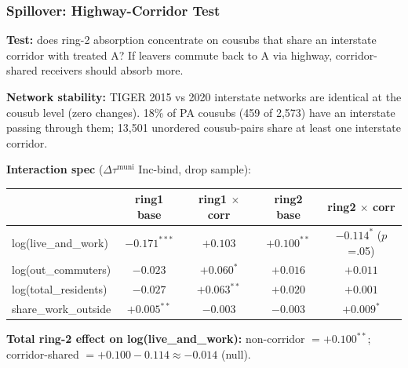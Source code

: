 \documentclass[xcolor = x11names, compress, aspectratio = 169]{beamer}
\begin{document}
    \begin{frame}
    \frametitle{Spillover: Highway-Corridor Test}
        \footnotesize
        \textbf{Test:} does ring-2 absorption concentrate on cousubs that
        share an interstate corridor with treated A? If leavers commute
        back to A via highway, corridor-shared receivers should absorb more.
        \medskip

        \textbf{Network stability:} TIGER 2015 vs 2020 interstate networks
        are identical at the cousub level (zero changes). 18\% of PA cousubs
        (459 of 2{,}573) have an interstate passing through them; 13{,}501
        unordered cousub-pairs share at least one interstate corridor.
        \medskip

        \textbf{Interaction spec} ($\Delta\tau^{\text{muni}}$ Inc-bind, drop sample):
        \scriptsize
        \renewcommand{\arraystretch}{1.15}
        \setlength{\tabcolsep}{6pt}
        \begin{tabular}{lcccc}
            \toprule
            & ring1 base & ring1 $\times$ corr & ring2 base & ring2 $\times$ corr \\
            \midrule
            log(live\_and\_work)  & $\bm{-0.171^{***}}$ & $+0.103$ & $\bm{+0.100^{**}}$ & $\bm{-0.114^{*}}$ ($p$=.05) \\
            log(out\_commuters)   & $-0.023$            & $+0.060^{*}$ & $+0.016$        & $+0.011$ \\
            log(total\_residents) & $-0.027$            & $+0.063^{**}$ & $+0.020$        & $+0.001$ \\
            share\_work\_outside  & $\bm{+0.005^{**}}$  & $-0.003$ & $-0.003$            & $+0.009^{*}$ \\
            \bottomrule
        \end{tabular}
        \vspace{0.10cm}
        \scriptsize
        \textbf{Total ring-2 effect on log(live\_and\_work):} non-corridor
        $= +0.100^{**}$; corridor-shared $= +0.100 - 0.114 \approx -0.014$ (null).
    \end{frame}
\end{document}

